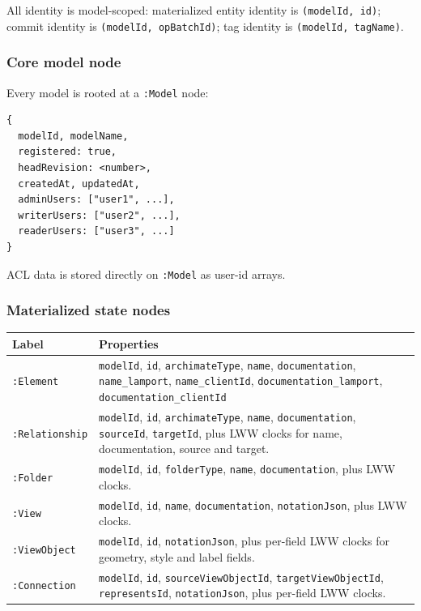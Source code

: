All identity is model-scoped: materialized entity identity is
\texttt{(modelId, id)}; commit identity is \texttt{(modelId, opBatchId)};
tag identity is \texttt{(modelId, tagName)}.

\subsubsection{Core model node}

Every model is rooted at a \texttt{:Model} node:

\begin{lstlisting}[caption={Model node properties}]
{
  modelId, modelName,
  registered: true,
  headRevision: <number>,
  createdAt, updatedAt,
  adminUsers: ["user1", ...],
  writerUsers: ["user2", ...],
  readerUsers: ["user3", ...]
}
\end{lstlisting}

ACL data is stored directly on \texttt{:Model} as user-id arrays.

\subsubsection{Materialized state nodes}

\begin{longtable}{p{30mm}p{124mm}}
\toprule
Label & Properties \\
\midrule
\texttt{:Element} & \texttt{modelId}, \texttt{id}, \texttt{archimateType},
  \texttt{name}, \texttt{documentation},
  \texttt{name\_lamport}, \texttt{name\_clientId},
  \texttt{documentation\_lamport}, \texttt{documentation\_clientId} \\
\texttt{:Relationship} & \texttt{modelId}, \texttt{id}, \texttt{archimateType},
  \texttt{name}, \texttt{documentation}, \texttt{sourceId}, \texttt{targetId},
  plus LWW clocks for name, documentation, source and target. \\
\texttt{:Folder} & \texttt{modelId}, \texttt{id}, \texttt{folderType},
  \texttt{name}, \texttt{documentation}, plus LWW clocks. \\
\texttt{:View} & \texttt{modelId}, \texttt{id}, \texttt{name},
  \texttt{documentation}, \texttt{notationJson}, plus LWW clocks. \\
\texttt{:ViewObject} & \texttt{modelId}, \texttt{id}, \texttt{notationJson},
  plus per-field LWW clocks for geometry, style and label fields. \\
\texttt{:Connection} & \texttt{modelId}, \texttt{id},
  \texttt{sourceViewObjectId}, \texttt{targetViewObjectId},
  \texttt{representsId}, \texttt{notationJson}, plus per-field LWW clocks. \\
\bottomrule
\end{longtable}

